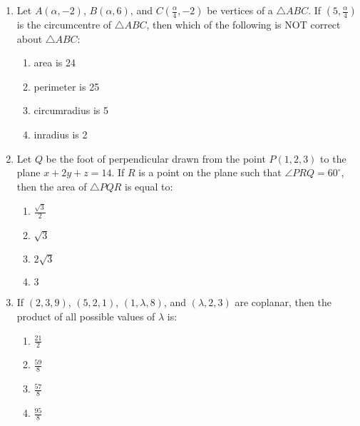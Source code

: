 \documentclass[journal]{IEEEtran}
\newcommand{\brak}[1]{\left( #1 \right)}
\begin{document}
\begin{enumerate}
    \item Let $A\brak{\alpha,-2}$, $B\brak{\alpha,6}$, and $C\brak{\frac{\alpha}{4},-2}$ be vertices of a $\triangle ABC$. If $\brak{5,\frac{\alpha}{4}}$ is the circumcentre of $\triangle ABC$, then which of the following is NOT correct about $\triangle ABC$:

        \begin{multicols}{4}
        \begin{enumerate}
        \item area is 24
        \item perimeter is 25
        \item circumradius is 5
        \item inradius is 2
        \end{enumerate}
        \end{multicols}

    \item Let $Q$ be the foot of perpendicular drawn from the point $P\brak{1,2,3}$ to the plane $x+2y+z=14$. If $R$ is a point on the plane such that $\angle PRQ=60^{\circ}$, then the area of $\triangle PQR$ is equal to:

        \begin{multicols}{4}
        \begin{enumerate}
        \item $\frac{\sqrt{3}}{2}$
        \item $\sqrt{3}$
        \item $2\sqrt{3}$
        \item $3$
        \end{enumerate}
        \end{multicols}
                
    \item If $\brak{2,3,9}$, $\brak{5,2,1}$, $\brak{1,\lambda,8}$, and $\brak{\lambda,2,3}$ are coplanar, then the product of all possible values of $\lambda$ is:

        \begin{multicols}{4}
        \begin{enumerate}
        \item $\frac{21}{2}$
        \item $\frac{59}{8}$
        \item $\frac{57}{8}$
        \item $\frac{95}{8}$
        \end{enumerate}
        \end{multicols}
        
\end{enumerate}
\end{document}

